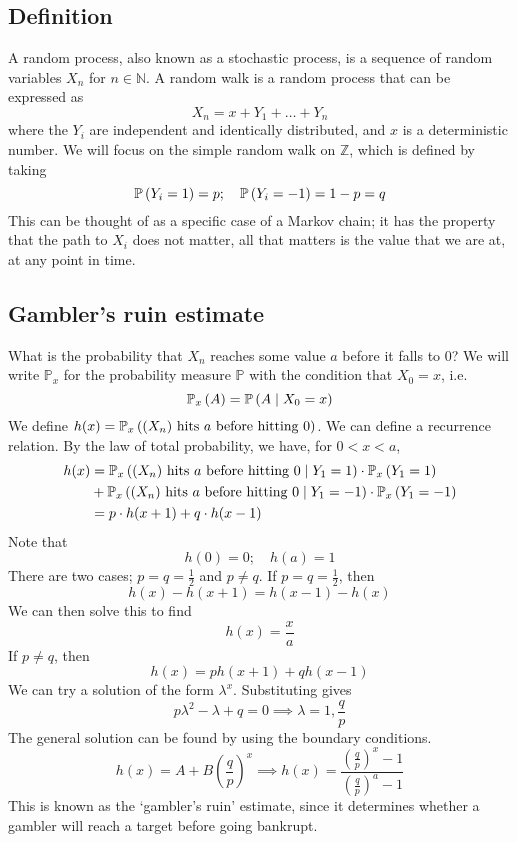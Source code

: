 \subsection{Definition}
A random process, also known as a stochastic process, is a sequence of random variables \(X_n\) for \(n \in \mathbb N\).
A random walk is a random process that can be expressed as
\[
	X_n = x + Y_1 + \dots + Y_n
\]
where the \(Y_i\) are independent and identically distributed, and \(x\) is a deterministic number.
We will focus on the simple random walk on \(\mathbb Z\), which is defined by taking
\[
	\mathbb{P}\left({Y_i = 1}\right) = p;\quad \mathbb{P}\left({Y_i = -1}\right) = 1-p = q
\]
This can be thought of as a specific case of a Markov chain; it has the property that the path to \(X_i\) does not matter, all that matters is the value that we are at, at any point in time.

\subsection{Gambler's ruin estimate}
What is the probability that \(X_n\) reaches some value \(a\) before it falls to 0?
We will write \(\mathbb P_x\) for the probability measure \(\mathbb P\) with the condition that \(X_0 = x\), i.e.
\[
	\mathbb{P}_{x}\left({A}\right) = \mathbb{P}\left({A \mid X_0 = x}\right)
\]
We define \(h(x) = \mathbb{P}_{x}\left({(X_n) \text{ hits } a \text{ before hitting 0}}\right)\).
We can define a recurrence relation.
By the law of total probability, we have, for \(0 < x < a\),
\begin{align*}
	h(x) & = \mathbb{P}_{x}\left({(X_n) \text{ hits \(a\) before hitting 0} \mid Y_1 = 1}\right) \cdot \mathbb{P}_{x}\left({Y_1 = 1}\right)   \\
	     & + \mathbb{P}_{x}\left({(X_n) \text{ hits \(a\) before hitting 0} \mid Y_1 = -1}\right) \cdot \mathbb{P}_{x}\left({Y_1 = -1}\right) \\
	     & = p \cdot h(x+1) + q \cdot h(x-1)
\end{align*}
Note that
\[
	h(0) = 0;\quad h(a) = 1
\]
There are two cases; \(p=q = \frac{1}{2}\) and \(p \neq q\).
If \(p=q=\frac{1}{2}\), then
\[
	h(x) - h(x+1) = h(x-1) - h(x)
\]
We can then solve this to find
\[
	h(x) = \frac{x}{a}
\]
If \(p \neq q\), then
\[
	h(x) = ph(x+1) + qh(x-1)
\]
We can try a solution of the form \(\lambda^x\).
Substituting gives
\[
	p\lambda^2 - \lambda + q = 0 \implies \lambda = 1, \frac{q}{p}
\]
The general solution can be found by using the boundary conditions.
\[
	h(x) = A + B \left( \frac{q}{p} \right)^x \implies h(x) = \frac{\left( \frac{q}{p} \right)^x - 1}{\left( \frac{q}{p} \right)^a - 1}
\]
This is known as the `gambler's ruin' estimate, since it determines whether a gambler will reach a target before going bankrupt.

